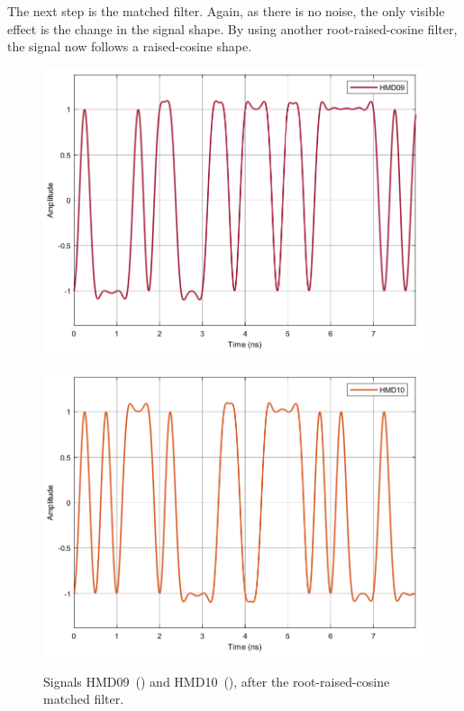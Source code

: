 The next step is the matched filter. Again, as there is no noise, the only 
visible effect is the change in the signal shape. By using another 
root-raised-cosine filter, the signal now follows a raised-cosine shape.

	\begin{figure}[H]
	\centering
	\begin{minipage}{0.45\textwidth}
		\centering
		\includegraphics[width=1\textwidth]		
		{./sdf/m_qam_system/figures/simulations/01_noISI/HMD09.pdf}
		\subcaption{}\label{fig:ISIhmd09}
	\end{minipage}
	\begin{minipage}{0.45\textwidth}
		\centering
		\includegraphics[width=1\textwidth]
		{sdf/m_qam_system/figures/simulations/01_noISI/HMD10.pdf}
		\subcaption{}\label{fig:ISIhmd10}
	\end{minipage}
	\caption{Signals HMD09~() and 
		HMD10~(), after the root-raised-cosine matched 
		filter.}\label{fig:ISIhmd0910}
\end{figure}


